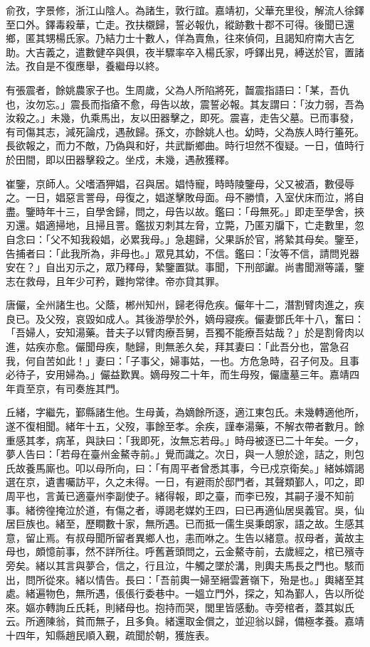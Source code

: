 \begin{pinyinscope}
俞孜，字景修，浙江山陰人。為諸生，敦行誼。嘉靖初，父華充里役，解流人徐鐸至口外。鐸毒殺華，亡走。孜扶櫬歸，誓必報仇，縱跡數十郡不可得。後聞已還鄉，匿其甥楊氏家。乃結力士十數人，佯為賣魚，往來偵伺，且謁知府南大吉乞助。大吉義之，遣數健卒與俱，夜半驟率卒入楊氏家，呼鐸出見，縛送於官，置諸法。孜自是不復應舉，養繼母以終。

有張震者，餘姚農家子也。生周歲，父為人所陷將死，齧震指語曰：「某，吾仇也，汝勿忘。」震長而指瘡不愈，母告以故，震誓必報。其友謂曰：「汝力弱，吾為汝殺之。」未幾，仇乘馬出，友以田器擊之，即死。震喜，走告父墓。已而事發，有司傷其志，減死論戍，遇赦歸。孫文，亦餘姚人也。幼時，父為族人時行箠死。長欲報之，而力不敵，乃偽與和好，共武斷鄉曲。時行坦然不復疑。一日，值時行於田間，即以田器擊殺之。坐戍，未幾，遇赦獲釋。

崔鑒，京師人。父嗜酒狎娼，召與居。娼恃寵，時時陵鑒母，父又被酒，數侵辱之。一日，娼惡言詈母，母復之，娼遂擊敗母面。母不勝憤，入室伏床而泣，將自盡。鑒時年十三，自學舍歸，問之，母告以故。鑑曰：「母無死。」即走至學舍，挾刃還。娼適掃地，且掃且詈。鑑拔刃刺其左脅，立斃，乃匿刃牖下，亡走數里，忽自念曰：「父不知我殺娼，必累我母。」急趨歸，父果訴於官，將縶其母矣。鑒至，告捕者曰：「此我所為，非母也。」眾見其幼，不信。鑑曰：「汝等不信，請問兇器安在？」自出刃示之，眾乃釋母，縶鑒置獄。事聞，下刑部讞。尚書聞淵等議，鑒志在救母，且年少可矜，難拘常律。帝亦貸其罪。

唐儼，全州諸生也。父蔭，郴州知州，歸老得危疾。儼年十二，潛割臂肉進之，疾良已。及父歿，哀毀如成人。其後游學於外，嫡母寢疾。儼妻鄧氏年十八，奮曰：「吾婦人，安知湯藥。昔夫子以臂肉療吾舅，吾獨不能療吾姑哉？」於是割脅肉以進，姑疾亦愈。儼聞母疾，馳歸，則無恙久矣，拜其妻曰：「此吾分也，當急召我，何自苦如此！」妻曰：「子事父，婦事姑，一也。方危急時，召子何及。且事必待子，安用婦為。」儼益歎異。嫡母歿二十年，而生母歿，儼廬墓三年。嘉靖四年貢至京，有司奏旌其門。

丘緒，字繼先，鄞縣諸生他。生母黃，為嫡餘所逐，適江東包氏。未幾轉適他所，遂不復相聞。緒年十五，父歿，事餘至孝。余疾，謹奉湯藥，不解衣帶者數月。餘重感其孝，病革，與訣曰：「我即死，汝無忘若母。」時母被逐已二十年矣。一夕，夢人告曰：「若母在臺州金鰲寺前。」覺而識之。次日，與一人憩於途，詰之，則包氏故養馬廝也。叩以母所向，曰：「有周平者曾悉其事，今已戍京衛矣。」緒姊婿謁選在京，遺書囑訪平，久之未得。一日，有避雨於邸門者，其聲類鄞人，叩之，即周平也，言黃已適臺州李副使子。緒得報，即之臺，而李已歿，其嗣子漫不知前事。緒徬徨掩泣於道，有傷之者，導謁老媒妁王四，曰已再適仙居吳義官。吳，仙居巨族也。緒至，歷瞷數十家，無所遇。已而抵一儒生吳秉朗家，語之故。生感其意，留止焉。有叔母聞所留者異鄉人也，恚而咻之。生告以緒意。叔母者，黃故主母也，頗憶前事，然不詳所往。呼舊蒼頭問之，云金鰲寺前，去歲經之，棺已殯寺旁矣。緒以其言與夢合，信之，行且泣，牛觸之墜於溝，則輿夫馬長之門也。駭而出，問所從來。緒以情告。長曰：「吾前輿一婦至縉雲蒼嶺下，殆是也。」輿緒至其處。緒遍物色，無所遇，倀倀行委巷中。一媼立門外，探之，知為鄞人，告以所從來。嫗亦轉詢丘氏耗，則緒母也。抱持而哭，閭里皆感動。寺旁棺者，蓋其姒氏云。所適陳翁，貧而無子，且多負。緒還取金償之，並迎翁以歸，備極孝養。嘉靖十四年，知縣趙民順入覲，疏聞於朝，獲旌表。


\end{pinyinscope}
